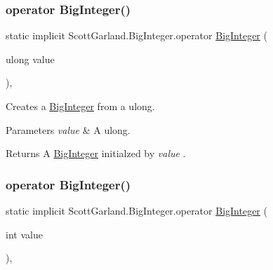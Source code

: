 \subsubsection{\texorpdfstring{operator Big\+Integer()}{operator BigInteger()}\hspace{0.1cm}{\footnotesize\ttfamily [2/4]}}
{\footnotesize\ttfamily static implicit Scott\+Garland.\+Big\+Integer.\+operator \hyperlink{class_scott_garland_1_1_big_integer}{Big\+Integer} (\begin{DoxyParamCaption}\item[{ulong}]{value }\end{DoxyParamCaption})\hspace{0.3cm}{\ttfamily [inline]}, {\ttfamily [static]}}



Creates a \hyperlink{class_scott_garland_1_1_big_integer}{Big\+Integer} from a ulong. 


\begin{DoxyParams}{Parameters}
{\em value} & A ulong.\\
\hline
\end{DoxyParams}
\begin{DoxyReturn}{Returns}
A \hyperlink{class_scott_garland_1_1_big_integer}{Big\+Integer} initialzed by {\itshape value} .
\end{DoxyReturn}
\mbox{\label{class_scott_garland_1_1_big_integer_a3a17f77a3e90cf657d105559ad35fecf}} 
\subsubsection{\texorpdfstring{operator Big\+Integer()}{operator BigInteger()}\hspace{0.1cm}{\footnotesize\ttfamily [3/4]}}
{\footnotesize\ttfamily static implicit Scott\+Garland.\+Big\+Integer.\+operator \hyperlink{class_scott_garland_1_1_big_integer}{Big\+Integer} (\begin{DoxyParamCaption}\item[{int}]{value }\end{DoxyParamCaption})\hspace{0.3cm}{\ttfamily [inline]}, {\ttfamily [static]}}



